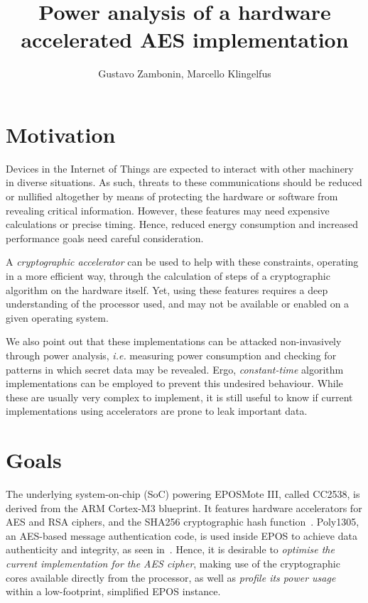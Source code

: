 \documentclass{../sftex/sftex}
\title{Power analysis of a hardware accelerated AES implementation}
\author{Gustavo Zambonin, Marcello Klingelfus}
\begin{document}
\maketitle

\section{Motivation}

Devices in the Internet of Things are expected to interact with other machinery
in diverse situations. As such, threats to these communications should be
reduced or nullified altogether by means of protecting the hardware or software
from revealing critical information. However, these features may need expensive
calculations or precise timing. Hence, reduced energy consumption and increased
performance goals need careful consideration.

A \emph{cryptographic accelerator} can be used to help with these constraints,
operating in a more efficient way, through the calculation of steps of a
cryptographic algorithm on the hardware itself. Yet, using these features
requires a deep understanding of the processor used, and may not be available
or enabled on a given operating system.

We also point out that these implementations can be attacked non-invasively
through power analysis, \emph{i.e.} measuring power consumption and checking
for patterns in which secret data may be revealed. Ergo, \emph{constant-time}
algorithm implementations can be employed to prevent this undesired behaviour.
While these are usually very complex to implement, it is still useful to know
if current implementations using accelerators are prone to leak important data.

\section{Goals}

The underlying system-on-chip (SoC) powering EPOSMote III, called CC2538, is
derived from the ARM Cortex-M3 blueprint. It features hardware accelerators for
AES and RSA ciphers, and the SHA256 cryptographic hash
function~\cite{Texas:report:2013:may}. Poly1305, an AES-based message
authentication code, is used inside EPOS to achieve data authenticity and
integrity, as seen in~\cite{Resner:inproc:2015:feb}. Hence, it is desirable to
\emph{optimise the current implementation for the AES cipher}, making use of
the cryptographic cores available directly from the processor, as well as
\emph{profile its power usage} within a low-footprint, simplified EPOS
instance.
\end{document}
